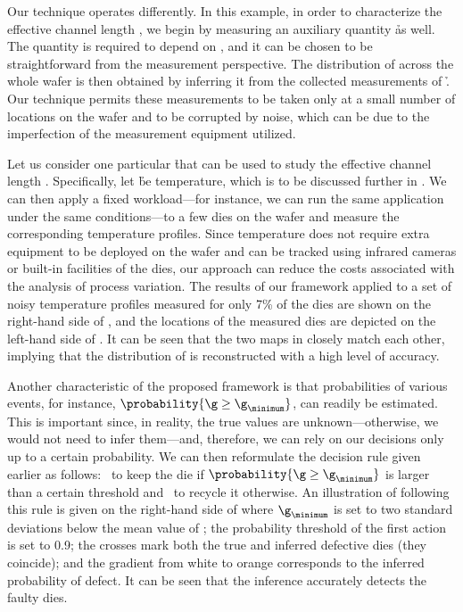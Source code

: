 Our technique operates differently. In this example, in order to characterize
the effective channel length \g, we begin by measuring an auxiliary quantity \h
as well. The quantity is required to depend on \g, and it can be chosen to be
straightforward from the measurement perspective. The distribution of \g across
the whole wafer is then obtained by inferring it from the collected measurements
of \h. Our technique permits these measurements to be taken only at a small
number of locations on the wafer and to be corrupted by noise, which can be due
to the imperfection of the measurement equipment utilized.

Let us consider one particular \h that can be used to study the effective
channel length \g. Specifically, let \h be temperature, which is to be discussed
further in . We can then apply a fixed workload---for
instance, we can run the same application under the same conditions---to a few
dies on the wafer and measure the corresponding temperature profiles. Since
temperature does not require extra equipment to be deployed on the wafer and can
be tracked using infrared cameras \cite{mesa-martinez2007} or built-in
facilities of the dies, our approach can reduce the costs associated with the
analysis of process variation. The results of our framework applied to a set of
noisy temperature profiles measured for only 7\% of the dies are shown on the
right-hand side of , and the locations of the measured
dies are depicted on the left-hand side of . It can
be seen that the two maps in  closely match each other,
implying that the distribution of \g is reconstructed with a high level of
accuracy.

Another characteristic of the proposed framework is that probabilities of
various events, for instance, $\probability{\g \geq \g_\minimum}$, can readily
be estimated. This is important since, in reality, the true values are
unknown---otherwise, we would not need to infer them---and, therefore, we can
rely on our decisions only up to a certain probability. We can then reformulate
the decision rule given earlier as follows: \one~to keep the die if
$\probability{\g \geq \g_\minimum}$ is larger than a certain threshold and
\two~to recycle it otherwise. An illustration of following this rule is given on
the right-hand side of  where $\g_\minimum$ is set
to two standard deviations below the mean value of \g; the probability threshold
of the first action is set to 0.9; the crosses mark both the true and inferred
defective dies (they coincide); and the gradient from white to orange
corresponds to the inferred probability of defect. It can be seen that the
inference accurately detects the faulty dies.

